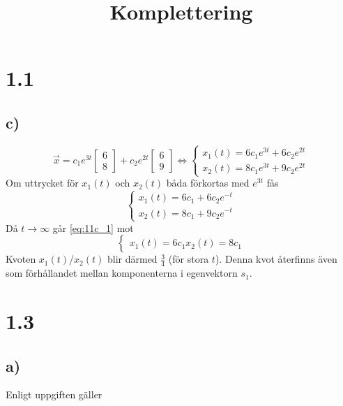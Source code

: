 \documentclass[a4paper]{article}
\title{Komplettering}
\begin{document}
\maketitle

\section*{1.1}
\subsection*{c)}

\begin{equation*}
  \vec{x} = c_1e^{3t}\begin{bmatrix}6\\8\end{bmatrix} + c_2e^{2t}\begin{bmatrix}6\\9\end{bmatrix}
  \iff \begin{cases}
    x_1(t) = 6c_1e^{3t} + 6c_2e^{2t}\\
    x_2(t) = 8c_1e^{3t} + 9c_2e^{2t}
    \end{cases}
\end{equation*}
Om uttrycket för $x_1(t)$ och $x_2(t)$ båda förkortas med $e^{3t}$ fås
\begin{equation*}
  \begin{cases}
    x_1(t) = 6c_1 + 6c_2e^{-t}\\
    x_2(t) = 8c_1 + 9c_2e^{-t}
\end{cases}\label{eq:11c_1}
\end{equation*}
Då $t\to\infty$ går \eqref{eq:11c_1} mot
\begin{equation*}
  \begin{cases}
    x_1(t) = 6c_1
    x_2(t) = 8c_1
\end{cases}
\end{equation*}
Kvoten $x_1(t)$/$x_2(t)$ blir därmed $\frac 34$ (för stora $t$). Denna kvot återfinns även som förhållandet mellan komponenterna i egenvektorn $s_1$.

\section*{1.3}
\subsection*{a)}

Enligt uppgiften gäller
\end{document}
